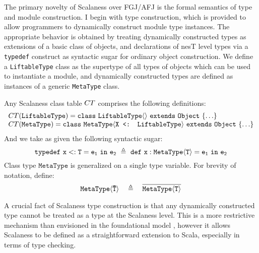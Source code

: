The primary novelty of Scalaness over FGJ/AFJ is the formal semantics of type and module
construction. I begin with type construction, which is provided to allow programmers to
dynamically construct module type instances. The appropriate behavior is obtained by treating
dynamically constructed types as extensions of a basic class of objects, and declarations of
nesT level types via a \texttt{typedef} construct as syntactic sugar for ordinary object
construction. We define a \texttt{LiftableType} class as the supertype of all types of objects
which can be used to instantiate a module, and dynamically constructed types are defined as
instances of a generic \texttt{MetaType} class.
\begin{definition}
Any Scalaness class table ${CT}$ comprises the following definitions:
$$
\begin{array}{l}
{CT}(\texttt{LiftableType}) = \mathtt{class\ \texttt{LiftableType}\langle \rangle\ extends\ Object\ \{\ldots \}}\\
{CT}(\texttt{MetaType}) = \mathtt{class\ \texttt{MetaType}\langle \texttt{X <: LiftableType}\rangle\ extends\ Object\ \{ \ldots  \}}
\end{array}
$$
And we take as given the following syntactic sugar:
$$
\jtlet{x}{T}{e_1}{e_2}\ \defeq\ \jdef{x}{\jinst{MetaType}{T}}{e_1}{e_2}
$$
Class type $\texttt{MetaType}$ is generalized on a single type variable. For brevity of
notation, define:
$$
\mathtt{\texttt{MetaType}\langle {\ensuremath{\mathtt{\bar{T}}}} \rangle}\quad \triangleq \quad \overline{\mathtt{MetaType\langle T \rangle}}
$$
\end{definition}
A crucial fact of Scalaness type construction is that any dynamically constructed type cannot be
treated as a type at the Scalaness level. This is a more restrictive mechanism than envisioned
in the foundational model \cite{FramedML,FramedMLworkshop}, however it allows Scalaness to be
defined as a straightforward extension to Scala, especially in terms of type checking.

